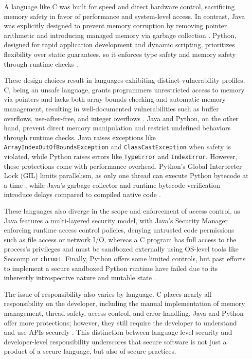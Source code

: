 \documentclass[conference]{IEEEtran}
\begin{document}
A language like C was built for speed and direct hardware control, sacrificing memory safety in favor of performance and system-level access. In contrast, Java was explicitly designed to prevent memory corruption by removing pointer arithmetic and introducing managed memory via garbage collection \cite{Sterbenz2000}. Python, designed for rapid application development and dynamic scripting, prioritizes flexibility over static guarantees, so it enforces type safety and memory safety through runtime checks \cite{Hamilton2015}.

These design choices result in languages exhibiting distinct vulnerability profiles. C, being an unsafe language, grants programmers unrestricted access to memory via pointers and lacks both array bounds checking and automatic memory management, resulting in well-documented vulnerabilities such as buffer overflows, use-after-free, and integer overflows \cite{Bocetta2020}. Java and Python, on the other hand, prevent direct memory manipulation and restrict undefined behaviors through runtime checks. Java raises exceptions like \texttt{ArrayIndexOutOfBoundsException} and \texttt{ClassCastException} when safety is violated, while Python raises errors like \texttt{TypeError} and \texttt{IndexError}. However, these protections come with performance overhead. Python's Global Interpreter Lock (GIL) limits parallelism, as only one thread can execute Python bytecode at a time \cite{Hamilton2015}, while Java’s garbage collector and runtime bytecode verification introduce delays compared to compiled native code \cite{Croft2021}.

These languages also diverge in the scope and enforcement of access control, as Java features a multi-layered security model, with Java's Security Manager enforcing runtime access control policies, denying untrusted code permissions such as file access or network I/O, whereas a C program has full access to the process’s privileges and must be sandboxed externally using OS-level tools like Seccomp or \texttt{chroot}. Finally, Python offers some limited controls, but past efforts to implement a secure sandboxed Python runtime have failed due to its inherently introspective nature and mutable state \cite{Sterbenz2000}.

The issue of responsibility also varies by language. C places nearly all responsibility on the developer, including the manual implementation of memory management, thread safety, access control, and error handling. Java and Python offer more protections; however, they still require the developer to understand and use APIs securely \cite{Meng2018}. This distinction between language-level security and developer-level responsibility underscores that secure software is not just a product of a secure language, but also of secure practices.
\end{document}
